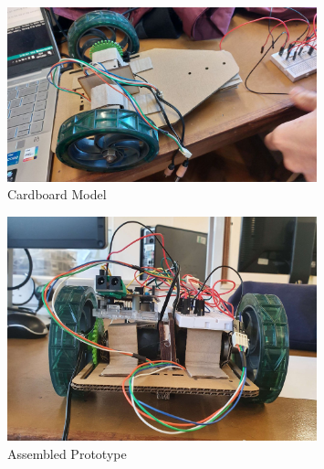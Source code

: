 \documentclass{article}
\begin{document}
\begin{figure}[!h]
    \centering
    \includegraphics[width=0.8\textwidth]{assets/Cardboard_model.jpg}
    \caption{Cardboard Model}
    \label{fig:cardboard_model}
\end{figure}

\begin{figure}[!h]
    \centering
    \includegraphics[width=0.8\textwidth]{assets/assembled_prototype.jpg}
    \caption{Assembled Prototype}
    \label{fig:assembled_prototype}
\end{figure}
\end{document}
